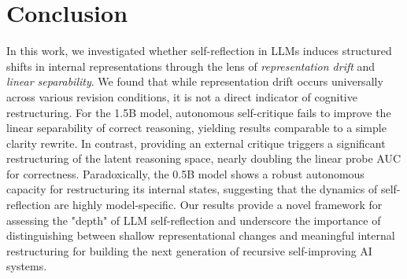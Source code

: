 \section{Conclusion}
\label{sec:conclusion}

In this work, we investigated whether self-reflection in LLMs induces structured shifts in internal representations through the lens of \textit{representation drift} and \textit{linear separability}. We found that while representation drift occurs universally across various revision conditions, it is not a direct indicator of cognitive restructuring. For the 1.5B model, autonomous self-critique fails to improve the linear separability of correct reasoning, yielding results comparable to a simple clarity rewrite. In contrast, providing an external critique triggers a significant restructuring of the latent reasoning space, nearly doubling the linear probe AUC for correctness. Paradoxically, the 0.5B model shows a robust autonomous capacity for restructuring its internal states, suggesting that the dynamics of self-reflection are highly model-specific. Our results provide a novel framework for assessing the "depth" of LLM self-reflection and underscore the importance of distinguishing between shallow representational changes and meaningful internal restructuring for building the next generation of recursive self-improving AI systems.
